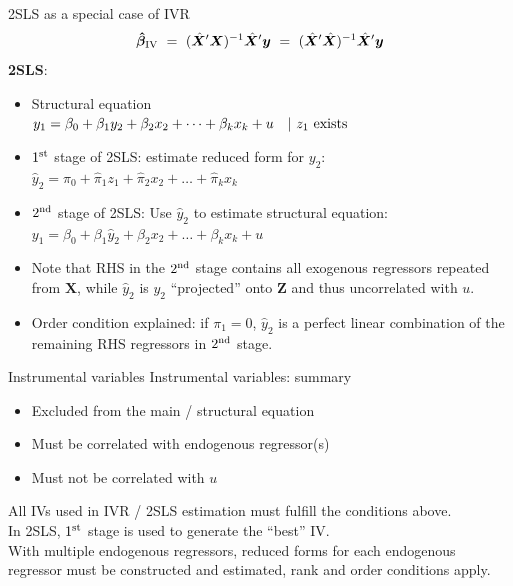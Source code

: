 \documentclass[usenames,dvipsnames]{beamer}
\begin{document}
\begin{frame}{2SLS as a special case of IVR}
$$
 \bm{\hat{\beta}}_{\textnormal{IV}} ~=~ 
 (\hat{\bm{X}}^{\prime}\bm{X})^{-1} \hat{\bm{X}}^{\prime}\bm{y} 
 ~=~ (\hat{\bm{X}}^{\prime}\hat{\bm{X}})^{-1} \hat{\bm{X}}^{\prime}\bm{y}
$$
\textbf{2SLS}: 
\begin{itemize}
\item Structural equation\\
\smallskip
$y_1=\beta_0+\beta_1 y_2+\beta_2 x_2+ \dots + \beta_k x_{k} +u \quad | ~z_1 \textnormal{~exists}$\\
\medskip
\item $1^{\textnormal{st}}$ stage of 2SLS: estimate reduced form for $y_2$:\\
\smallskip
$\hat{y}_2=\hat{\pi}_0+\hat{\pi}_1 z_1 + \hat{\pi}_{2} x_{2} + \dots +\hat{\pi}_k x_k$
\medskip
\item $2^{\textnormal{nd}}$ stage of 2SLS: Use $\hat{y}_2$ to estimate structural equation:\\
\smallskip
$y_1=\beta_0+\beta_1 \hat{y}_2 +\beta_2 x_2+ \dots + \beta_k x_{k} +u$
\smallskip
\item Note that RHS in the $2^{\textnormal{nd}}$ stage contains all exogenous regressors repeated from $\bm{X}$, while $\hat{y}_2$ is $y_2$ ``projected'' onto $\bm{Z}$ and thus uncorrelated with $u$.
\item Order condition explained: if $\pi_1=0$, $\hat{y}_2$ is a perfect linear combination of the remaining RHS regressors in $2^{\textnormal{nd}}$ stage.
\end{itemize}
\end{frame}
\begin{frame}{Instrumental variables}
Instrumental variables: summary\\
\vspace{0.3cm}
\begin{itemize}
\item Excluded from the main / structural equation
\item Must be correlated with endogenous regressor(s)
\item Must not be correlated with $u$
\end{itemize}
\vspace{0.3cm}
All IVs used in IVR / 2SLS estimation must fulfill the conditions above.\\
\vspace{0.3cm}
In 2SLS, $1^{\textnormal{st}}$ stage is used to generate the ``best'' IV.\\
With multiple endogenous regressors, reduced forms for each endogenous regressor must be constructed and estimated, rank and order conditions apply.
\end{frame}
\end{document}
